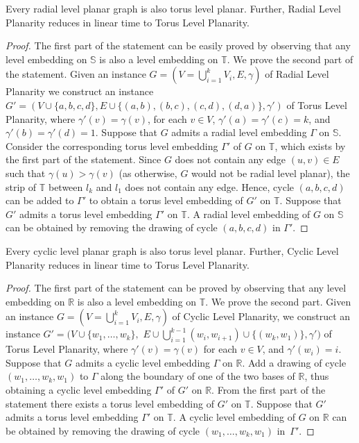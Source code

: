 \documentclass{llncs}
\begin{document}
\begin{lemma}\label{le:radial-torus}
Every radial level planar graph is also torus level planar.
Further, {\sc Radial Level Planarity} reduces in linear time to {\sc Torus Level Planarity}.
\end{lemma}

\begin{proof}
The first part of the statement can be easily proved by observing that any level embedding on $\mathbb S$ is also a level embedding on $\mathbb T$.
We prove the second part of the statement. 
		Given an instance $G=(V=\bigcup_{i=1}^k{V_i},E,\gamma)$ of {\sc Radial Level Planarity} we construct an instance $G'=(V \cup \{a,b,c,d\}, E \cup \{(a,b),(b,c),(c,d),(d,a)\},\gamma')$ of {\sc Torus Level Planarity}, where $\gamma'(v) = \gamma(v)$, for each $v \in V$, $\gamma'(a)=\gamma'(c)=k$, and $\gamma'(b)=\gamma'(d)=1$. 
Suppose that $G$ admits a radial level embedding $\Gamma$ on $\mathbb S$. Consider the corresponding torus level embedding $\Gamma'$ of $G$ on $\mathbb T$, which exists by the first part of the statement. Since $G$ does not contain any edge $(u,v) \in E$ such that $\gamma(u)>\gamma(v)$ (as otherwise, $G$ would not be radial level planar), the strip of $\mathbb T$ between $l_k$ and $l_1$ does not contain any edge. Hence, cycle $(a,b,c,d)$ can be added to $\Gamma'$ to obtain a torus level embedding of $G'$ on $\mathbb T$.
		Suppose that $G'$ admits a torus level embedding $\Gamma'$ on $\mathbb T$.
		A radial level embedding of $G$ on $\mathbb S$ can be obtained by removing the drawing of cycle $(a,b,c,d)$ in $\Gamma'$.
		\end{proof}

\begin{lemma}\label{le:cyclic-torus}
Every cyclic level planar graph is also torus level planar.
Further, {\sc Cyclic Level Planarity} reduces in linear time to {\sc Torus Level Planarity}.
\end{lemma}

\begin{proof}
The first part of the statement can be proved by observing that any level embedding on $\mathbb R$ is also a level embedding on $\mathbb T$.
We prove the second part. Given an instance $G=(V=\bigcup_{i=1}^k{V_i},E,\gamma)$ of {\sc Cyclic Level Planarity}, we construct an instance $G'=(V \cup \{w_1,\dots,w_k\},$ $E \cup \bigcup_{i=1}^{k-1}{(w_i,w_{i+1})} \cup \{(w_k,w_1)\},\gamma')$ of {\sc Torus Level Planarity}, where $\gamma'(v) = \gamma(v)$ for each $v \in V$, and $\gamma'(w_i)=i$.
Suppose that $G$ admits a cyclic level embedding $\Gamma$ on $\mathbb R$. Add a drawing of cycle $(w_1,\dots,w_k,w_1)$ to $\Gamma$ along the boundary of one of the two bases of $\mathbb R$, thus obtaining a cyclic level embedding $\Gamma'$ of $G'$ on $\mathbb R$. From the first part of the statement there exists a torus level embedding of $G'$ on $\mathbb T$.
Suppose that $G'$ admits a torus level embedding $\Gamma'$ on $\mathbb T$.
A cyclic level embedding of $G$ on $\mathbb R$ can be obtained by removing the drawing of cycle $(w_1,\dots,w_k,w_1)$ in~$\Gamma'$.
\end{proof}
\end{document}
